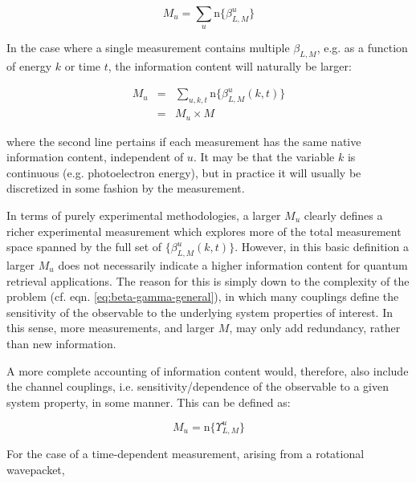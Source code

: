 \begin{equation}
M_{u}=\sum_{u}\mathrm{n}\{\beta_{L,M}^{u}\}
\end{equation}

In the case where a single measurement contains multiple $\beta_{L,M}$, e.g. as a function of energy $k$ or time $t$, the information content will naturally be larger:

\begin{eqnarray}
M_{u} & = & \sum_{u,k,t}\mathrm{n}\{\beta_{L,M}^{u}(k,t)\}\\
 & = & M_{u}\times M
\end{eqnarray}

where the second line pertains if each measurement has the same native
information content, independent of $u$. It may be that the variable
$k$ is continuous (e.g. photoelectron energy), but in practice it
will usually be discretized in some fashion by the measurement.

In terms of purely experimental methodologies, a larger $M_{u}$ clearly defines a richer experimental measurement which explores more of the total measurement space spanned by the full set of $\{\beta_{L,M}^{u}(k,t)\}$. However, in this basic definition a larger $M_{u}$ does not necessarily indicate a higher information content for quantum retrieval applications.
The reason for this is simply down to the complexity of the problem
(cf. eqn. \ref{eq:beta-gamma-general}), in which many couplings define
the sensitivity of the observable to the underlying system properties
of interest. In this sense, more measurements, and larger $M$, may
only add redundancy, rather than new information.

A more complete accounting of information content would, therefore,
also include the channel couplings, i.e. sensitivity/dependence of the observable to a given system property, in some manner. This can be defined as:

\begin{equation}
M_{u}=\mathrm{n}\{\varUpsilon_{L,M}^{u}\}
\end{equation}

For the case of a time-dependent measurement, arising from a rotational wavepacket, 





